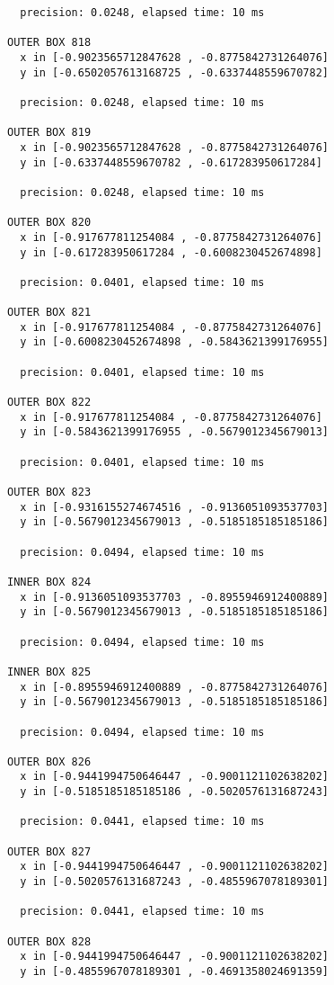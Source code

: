 \begin{verbatim}
  precision: 0.0248, elapsed time: 10 ms

OUTER BOX 818
  x in [-0.9023565712847628 , -0.8775842731264076]
  y in [-0.6502057613168725 , -0.6337448559670782]

  precision: 0.0248, elapsed time: 10 ms

OUTER BOX 819
  x in [-0.9023565712847628 , -0.8775842731264076]
  y in [-0.6337448559670782 , -0.617283950617284]

  precision: 0.0248, elapsed time: 10 ms

OUTER BOX 820
  x in [-0.917677811254084 , -0.8775842731264076]
  y in [-0.617283950617284 , -0.6008230452674898]

  precision: 0.0401, elapsed time: 10 ms

OUTER BOX 821
  x in [-0.917677811254084 , -0.8775842731264076]
  y in [-0.6008230452674898 , -0.5843621399176955]

  precision: 0.0401, elapsed time: 10 ms

OUTER BOX 822
  x in [-0.917677811254084 , -0.8775842731264076]
  y in [-0.5843621399176955 , -0.5679012345679013]

  precision: 0.0401, elapsed time: 10 ms

OUTER BOX 823
  x in [-0.9316155274674516 , -0.9136051093537703]
  y in [-0.5679012345679013 , -0.5185185185185186]

  precision: 0.0494, elapsed time: 10 ms

INNER BOX 824
  x in [-0.9136051093537703 , -0.8955946912400889]
  y in [-0.5679012345679013 , -0.5185185185185186]

  precision: 0.0494, elapsed time: 10 ms

INNER BOX 825
  x in [-0.8955946912400889 , -0.8775842731264076]
  y in [-0.5679012345679013 , -0.5185185185185186]

  precision: 0.0494, elapsed time: 10 ms

OUTER BOX 826
  x in [-0.9441994750646447 , -0.9001121102638202]
  y in [-0.5185185185185186 , -0.5020576131687243]

  precision: 0.0441, elapsed time: 10 ms

OUTER BOX 827
  x in [-0.9441994750646447 , -0.9001121102638202]
  y in [-0.5020576131687243 , -0.4855967078189301]

  precision: 0.0441, elapsed time: 10 ms

OUTER BOX 828
  x in [-0.9441994750646447 , -0.9001121102638202]
  y in [-0.4855967078189301 , -0.4691358024691359]


\end{verbatim}
